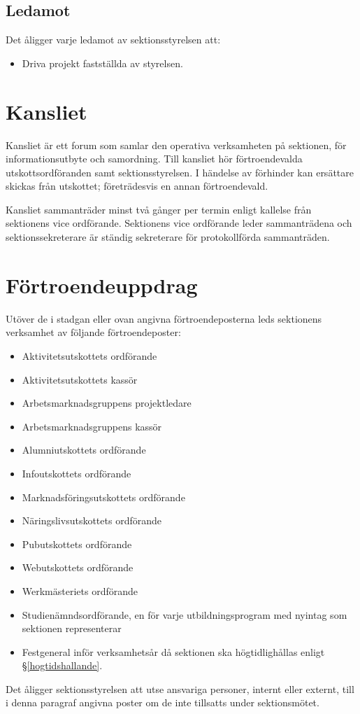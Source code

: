 \documentclass{datateknologsektionen-document}
\begin{document}
\subsection{Ledamot}
\label{ledamot}
Det åligger varje ledamot av sektionsstyrelsen att:
\begin{itemize}
  \item Driva projekt fastställda av styrelsen.
\end{itemize}

\section{Kansliet}
Kansliet är ett forum som samlar den operativa verksamheten på sektionen, för
informationsutbyte och samordning. Till kansliet hör förtroendevalda utskottsordföranden
samt sektionsstyrelsen. I händelse av förhinder kan ersättare skickas från utskottet;
företrädesvis en annan förtroendevald.

Kansliet sammanträder minst två gånger per termin enligt kallelse från sektionens
vice ordförande. Sektionens vice ordförande leder sammanträdena och sektionssekreterare
är ständig sekreterare för protokollförda sammanträden.

\section{Förtroendeuppdrag}
Utöver de i stadgan eller ovan angivna förtroendeposterna leds sektionens verksamhet av följande förtroendeposter:
\begin{itemize}
  \item Aktivitetsutskottets ordförande
  \item Aktivitetsutskottets kassör
  \item Arbetsmarknadsgruppens projektledare
  \item Arbetsmarknadsgruppens kassör
  \item Alumniutskottets ordförande
  \item Infoutskottets ordförande
  \item Marknadsföringsutskottets ordförande
  \item Näringslivsutskottets ordförande
  \item Pubutskottets ordförande
  \item Webutskottets ordförande
  \item Werkmästeriets ordförande
  \item Studienämndsordförande, en för varje utbildningsprogram med nyintag som sektionen representerar
  \item Festgeneral inför verksamhetsår då sektionen ska högtidlighållas enligt \S \ref{hogtidshallande}.
\end{itemize}
Det åligger sektionsstyrelsen att utse ansvariga personer, internt eller externt, till i denna paragraf angivna poster om de inte tillsatts under sektionsmötet.
\end{document}
